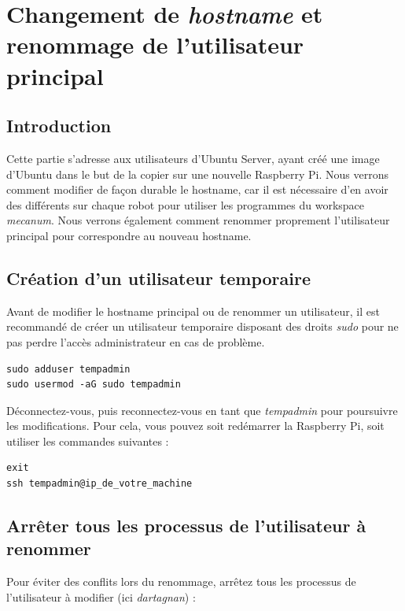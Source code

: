 \chapter{Changement de \textit{hostname} et renommage de l'utilisateur principal}

\section*{Introduction}

Cette partie s'adresse aux utilisateurs d'Ubuntu Server, ayant créé une image d'Ubuntu dans le but de la copier sur une nouvelle Raspberry Pi.  
Nous verrons comment modifier de façon durable le hostname, car il est nécessaire d'en avoir des différents sur chaque robot pour utiliser les programmes du workspace \textit{mecanum}.  
Nous verrons également comment renommer proprement l'utilisateur principal pour correspondre au nouveau hostname.



\section{Création d'un utilisateur temporaire}

Avant de modifier le hostname principal ou de renommer un utilisateur, il est recommandé de créer un utilisateur temporaire disposant des droits \textit{sudo} pour ne pas perdre l'accès administrateur en cas de problème.

\begin{lstlisting}[style=commandstyle]
sudo adduser tempadmin
sudo usermod -aG sudo tempadmin
\end{lstlisting}

Déconnectez-vous, puis reconnectez-vous en tant que \textit{tempadmin} pour poursuivre les modifications.  
Pour cela, vous pouvez soit redémarrer la Raspberry Pi, soit utiliser les commandes suivantes :

\begin{lstlisting}[style=commandstyle]
exit
ssh tempadmin@ip_de_votre_machine
\end{lstlisting}



\section{Arrêter tous les processus de l'utilisateur à renommer}

Pour éviter des conflits lors du renommage, arrêtez tous les processus de l'utilisateur à modifier (ici \textit{dartagnan}) :

